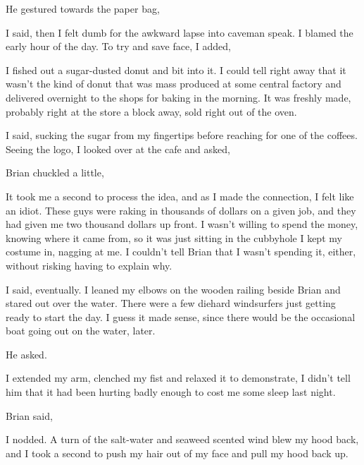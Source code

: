 He gestured towards the paper bag, 

 I said, then I felt dumb for the awkward lapse into caveman speak. I blamed the early hour of the day. To try and save face, I added, 

I fished out a sugar-dusted donut and bit into it. I could tell right away that it wasn't the kind of donut that was mass produced at some central factory and delivered overnight to the shops for baking in the morning. It was freshly made, probably right at the store a block away, sold right out of the oven.

 I said, sucking the sugar from my fingertips before reaching for one of the coffees. Seeing the logo, I looked over at the cafe and asked, 

Brian chuckled a little, 

It took me a second to process the idea, and as I made the connection, I felt like an idiot. These guys were raking in thousands of dollars on a given job, and they had given me two thousand dollars up front. I wasn't willing to spend the money, knowing where it came from, so it was just sitting in the cubbyhole I kept my costume in, nagging at me. I couldn't tell Brian that I wasn't spending it, either, without risking having to explain why.

 I said, eventually. I leaned my elbows on the wooden railing beside Brian and stared out over the water. There were a few diehard windsurfers just getting ready to start the day. I guess it made sense, since there would be the occasional boat going out on the water, later.

 He asked.

I extended my arm, clenched my fist and relaxed it to demonstrate,  I didn't tell him that it had been hurting badly enough to cost me some sleep last night.

 Brian said, 

I nodded. A turn of the salt-water and seaweed scented wind blew my hood back, and I took a second to push my hair out of my face and pull my hood back up.

